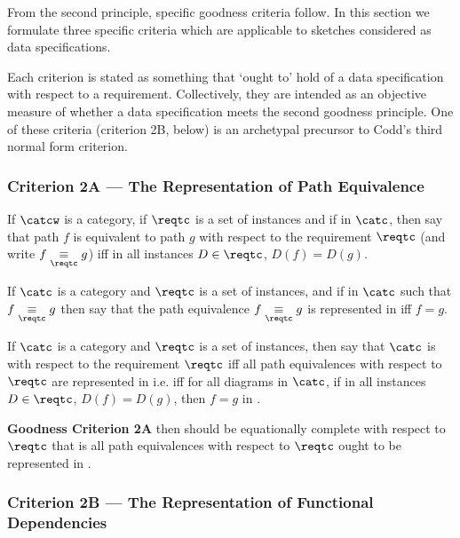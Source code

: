 
From the second principle, specific goodness criteria follow. In this section we formulate three specific criteria which are applicable to  sketches considered as data specifications. 

Each criterion is stated as something that `ought to' hold of a data specification with respect to a requirement. 
Collectively, they are intended as an objective measure of whether
a data specification meets the second goodness principle.
One of these criteria (criterion 2B, below) is an archetypal precursor to Codd's third normal form criterion. 



\subsubsection{Criterion 2A --- The Representation of Path Equivalence}
\newcommand{\pequiv}[1][\reqtc]{\underset{#1}{\equiv}}

\begin{definition}
If $\catcw$ is a  category, if $\reqtc$ is a set of instances
 and if \fgparalleldiag in $\catc$, then say that path $f$ is equivalent to path $g$ with respect to the requirement $\reqtc$ 
 (and write $f \pequiv g$) iff
in all instances $D \in \reqtc$, $D(f)=D(g)$.
\end{definition}

\begin{definition}
If $\catc$ is a  category and $\reqtc$ is a set of instances,
 and if \fgparalleldiag in $\catc$ such that $f \pequiv g$
 then say that the path equivalence $f \pequiv g$ is represented in \catcw iff
 $f=g$.
\end{definition}

\begin{definition}
If $\catc$ is a  category and $\reqtc$ is a set of instances,
 then say that  $\catc$ is  with respect 
to the requirement $\reqtc$ iff all path equivalences with respect to $\reqtc$ are represented in \catcw 
i.e. iff for all diagrams \fgparalleldiag in $\catc$,  
if in all instances $D \in \reqtc $, $D(f)=D(g)$,  then $f=g$ in \catc.
\end{definition}

\textbf{Goodness Criterion 2A} \IfSforCwithRCwords then \catcw should be equationally complete with respect to $\reqtc$ that is all path equivalences with respect to $\reqtc$  ought to be represented in \catc.

\subsubsection{Criterion 2B --- The Representation of Functional Dependencies}

